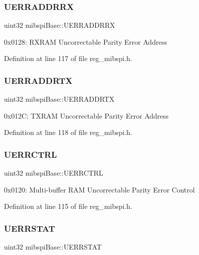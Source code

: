 \subsubsection{\texorpdfstring{U\+E\+R\+R\+A\+D\+D\+R\+RX}{UERRADDRRX}}
{\footnotesize\ttfamily uint32 mibspi\+Base\+::\+U\+E\+R\+R\+A\+D\+D\+R\+RX}

0x0128\+: R\+X\+R\+AM Uncorrectable Parity Error Address 

Definition at line 117 of file reg\+\_\+mibspi.\+h.

\mbox{\label{structmibspiBase_a7def0abd4b117621f5b6897b1de9be60}} 
\subsubsection{\texorpdfstring{U\+E\+R\+R\+A\+D\+D\+R\+TX}{UERRADDRTX}}
{\footnotesize\ttfamily uint32 mibspi\+Base\+::\+U\+E\+R\+R\+A\+D\+D\+R\+TX}

0x012C\+: T\+X\+R\+AM Uncorrectable Parity Error Address 

Definition at line 118 of file reg\+\_\+mibspi.\+h.

\mbox{\label{structmibspiBase_a2d0f4fac8357b3c6fc5c407b45723062}} 
\subsubsection{\texorpdfstring{U\+E\+R\+R\+C\+T\+RL}{UERRCTRL}}
{\footnotesize\ttfamily uint32 mibspi\+Base\+::\+U\+E\+R\+R\+C\+T\+RL}

0x0120\+: Multi-\/buffer R\+AM Uncorrectable Parity Error Control 

Definition at line 115 of file reg\+\_\+mibspi.\+h.

\mbox{\label{structmibspiBase_a9f674f149ade46f4bbbb327eb40828e3}} 
\subsubsection{\texorpdfstring{U\+E\+R\+R\+S\+T\+AT}{UERRSTAT}}
{\footnotesize\ttfamily uint32 mibspi\+Base\+::\+U\+E\+R\+R\+S\+T\+AT}

